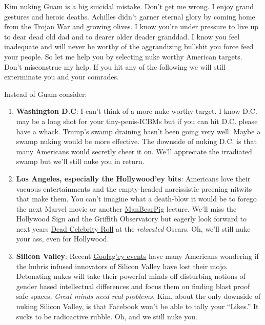 Kim nuking Guam is a big suicidal mistake. Don't get me wrong. I enjoy
grand gestures and heroic deaths. Achilles didn't garner eternal glory
by coming home from the Trojan War and growing olives. I know you're
under pressure to live up to dear dead old dad and to dearer older
deader granddad. I know you feel inadequate and will never be worthy of
the aggrandizing bullshit you force feed your people. So let me help you
by selecting nuke worthy American targets. Don't misconstrue my help. If
you hit any of the following we will still exterminate you and your
comrades.

Instead of Guam consider:

\begin{enumerate}
\def\labelenumi{\arabic{enumi}.}
\item
  \textbf{Washington D.C}: I can't think of a more nuke worthy target. I
  know D.C. may be a long shot for your tiny-penis-ICBMs but if you can
  hit D.C. please have a whack. Trump's swamp draining hasn't been going
  very well. Maybe a swamp nuking would be more effective. The downside
  of nuking D.C. is that many Americans would secretly cheer it on.
  We'll appreciate the irradiated swamp but we'll still nuke you in
  return.
\item
  \textbf{Los Angeles, especially the Hollywood'ey bits}: Americans love
  their vacuous entertainments and the empty-headed narcissistic
  preening nitwits that make them. You can't imagine what a death-blow
  it would be to forego the next Marvel movie or another
  \href{https://www.youtube.com/watch?v=xf69EEL3WBk}{ManBearPig}
  lecture. We'll miss the Hollywood Sign and the Griffith Observatory
  but eagerly look forward to next years
  \href{http://www.legacy.com/memorial-sites/oscars/}{Dead Celebrity
  Roll} at the \emph{relocated} Oscars. Oh, we'll still nuke your ass,
  even for Hollywood.
\item
  \textbf{Silicon Valley}: Recent
  \href{http://www.businessinsider.com/anti-google-ads-pop-up-outside-office-criticizing-ceo-sundar-pichai-2017-8}{Goolag'ey
  events} have many Americans wondering if the hubris infused innovators
  of Silicon Valley have lost their mojo. Detonating nukes will take
  their powerful minds off disturbing notions of gender based
  intellectual differences and focus them on finding blast proof safe
  spaces. \emph{Great minds need real problems.} Kim, about the only
  downside of nuking Silicon Valley, is that Facebook won't be able to
  tally your ``Likes.'' It sucks to be radioactive rubble. Oh, and we
  still nuke
  you.
  

\end{enumerate}
